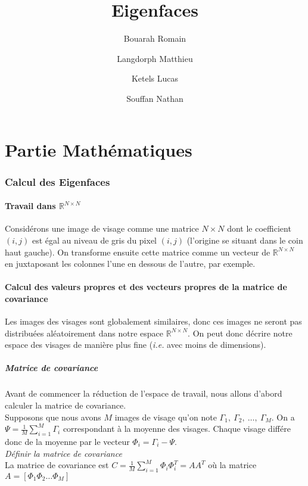 \documentclass[12pt,french]{article}
\title{Eigenfaces}
\author{
Bouarah Romain \and
Langdorph Matthieu \and
Ketels Lucas \and
Souffan Nathan
}
\begin{document}
\maketitle
\newpage

\part{Partie Mathématiques}


\section{Calcul des Eigenfaces}

\subsection{Travail dans $\mathbb{R}^{N \times N}$}
Considérons une image de visage comme une matrice $N \times N$ dont le coefficient $(i,j)$ est égal au niveau de gris du pixel $(i,j)$ (l'origine se situant dans le coin haut gauche).  
On transforme ensuite cette matrice comme un vecteur de $\mathbb{R}^{N \times N}$ en juxtaposant les colonnes l'une en dessous de l'autre, par exemple.

\subsection{Calcul des valeurs propres et des vecteurs propres de la matrice de covariance}
Les images des visages sont globalement similaires, donc ces images ne seront pas distribuées aléatoirement dans notre espace $\mathbb{R}^{N \times N}$.
On peut donc décrire notre espace des visages de manière plus fine (\textit{i.e.} avec moins de dimensions).

\subsubsection{Matrice de covariance}
Avant de commencer la réduction de l'espace de travail, nous allons d'abord calculer la matrice de covariance.\\
Supposons que nous avons $M$ images de visage qu'on note $\Gamma_1,~\Gamma_2,~\dots,~\Gamma_M$. On a $\Psi = \frac{1}{M}\displaystyle\sum_{i=1}^{M} \Gamma_i$ correspondant à la moyenne des visages.
Chaque visage différe donc de la moyenne par le vecteur $\Phi_i = \Gamma_i - \Psi$.
\\ \emph{Définir la matrice de covariance}\\
La matrice de covariance est $C = \frac{1}{M}\displaystyle\sum_{i=1}^{M} \Phi_i \Phi_i^T=AA^T$ où la matrice $A = [\Phi_1 \Phi_2 \dots \Phi_M]$
\end{document}
